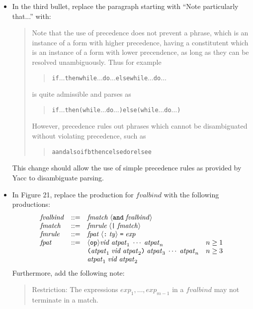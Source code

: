 \documentclass[twoside,titlepage]{article}
\newcommand{\void}[1]{}
\begin{document}
\begin{appendix}
\begin{itemize}
\item In the third bullet, replace the paragraph starting with ``Note particularly that...'' with:
  \begin{quote}
  Note that the use of precedence does not prevent a phrase, which is an instance of a form with higher precedence, having a constitutent which is an instance of a form
  with lower precendence, as long as they can be resolved unambiguously. Thus for example
  \begin{quote}
  \begin{alltt}
  if \(\dots\) then while \(\dots\) do \(\dots\) else while \(\dots\) do \(\dots\)
  \end{alltt}
  \end{quote}
  is quite admissible and parses as
  \begin{quote}
  \begin{alltt}
  if \(\dots\) then (while \(\dots\) do \(\dots\)) else (while \(\dots\) do \(\dots\))
  \end{alltt}
  \end{quote}
  However, precedence rules out phrases which cannot be disambiguated without violating precedence, such as
  \begin{quote}
  \begin{alltt}
  a andalso if b then c else d orelse e
  \end{alltt}
  \end{quote}
  \end{quote}
This change should allow the use of simple precedence rules as provided by Yacc to disambiguate parsing.

\item In Figure 21,\void{ in the production for $\mathit{fvalbind}$, add indices $1..m$ to the optional $\mathit{ty}$ annotations.} replace the production for $\mathit{fvalbind}$ with the following productions:
\begin{displaymath}
\begin{array}{lcll}
\mathit{fvalbind} &::=& \mathit{fmatch} \;
	\langle{\tt{and}} \; \mathit{fvalbind}\rangle \\
\mathit{fmatch} &::=& \mathit{fmrule} \;
	\langle\mbox{\tt|} \; \mathit{fmatch}\rangle \\
\mathit{fmrule} &::=& \mathit{fpat} \;
	\langle\mbox{\tt:} \; \mathit{ty}\rangle \; \mbox{\tt=} \; \mathit{exp} \\
\mathit{fpat} &::=& \langle{\tt{op}}\rangle \mathit{vid} \;
	\mathit{atpat}_1 \; \cdots \; \mathit{atpat}_n & n\geq1 \\
&& \mbox{\tt(}\mathit{atpat}_1 \; \mathit{vid} \; \mathit{atpat}_2\mbox{\tt)} \;
	\mathit{atpat}_3 \; \cdots \; \mathit{atpat}_n & n\geq3 \\
&& \mathit{atpat}_1 \; \mathit{vid} \; \mathit{atpat}_2
\end{array}
\end{displaymath}
Furthermore, add the following note:
  \begin{quote}
  Restriction: The expressions $\mathit{exp}_1,\dots,\mathit{exp}_{m-1}$ in a $\mathit{fvalbind}$ may not terminate in a match.
  \end{quote}


\end{itemize}
\end{appendix}
\end{document}

